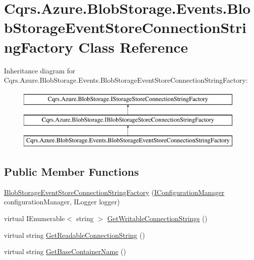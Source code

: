 \hypertarget{classCqrs_1_1Azure_1_1BlobStorage_1_1Events_1_1BlobStorageEventStoreConnectionStringFactory}{}\section{Cqrs.\+Azure.\+Blob\+Storage.\+Events.\+Blob\+Storage\+Event\+Store\+Connection\+String\+Factory Class Reference}
\label{classCqrs_1_1Azure_1_1BlobStorage_1_1Events_1_1BlobStorageEventStoreConnectionStringFactory}
Inheritance diagram for Cqrs.\+Azure.\+Blob\+Storage.\+Events.\+Blob\+Storage\+Event\+Store\+Connection\+String\+Factory\+:\begin{figure}[H]
\begin{center}
\leavevmode
\includegraphics[height=3.000000cm]{classCqrs_1_1Azure_1_1BlobStorage_1_1Events_1_1BlobStorageEventStoreConnectionStringFactory}
\end{center}
\end{figure}
\subsection*{Public Member Functions}
\begin{DoxyCompactItemize}
\item 
\hyperlink{classCqrs_1_1Azure_1_1BlobStorage_1_1Events_1_1BlobStorageEventStoreConnectionStringFactory_a6ace1481cc61d75f5d472e374566e477_a6ace1481cc61d75f5d472e374566e477}{Blob\+Storage\+Event\+Store\+Connection\+String\+Factory} (\hyperlink{interfaceCqrs_1_1Configuration_1_1IConfigurationManager}{I\+Configuration\+Manager} configuration\+Manager, I\+Logger logger)
\item 
virtual I\+Enumerable$<$ string $>$ \hyperlink{classCqrs_1_1Azure_1_1BlobStorage_1_1Events_1_1BlobStorageEventStoreConnectionStringFactory_a002b45d6a893b1b3024b0e7c97f1c9ac_a002b45d6a893b1b3024b0e7c97f1c9ac}{Get\+Writable\+Connection\+Strings} ()
\item 
virtual string \hyperlink{classCqrs_1_1Azure_1_1BlobStorage_1_1Events_1_1BlobStorageEventStoreConnectionStringFactory_aa47606e4cd5a71437bed71e07fda53ed_aa47606e4cd5a71437bed71e07fda53ed}{Get\+Readable\+Connection\+String} ()
\item 
virtual string \hyperlink{classCqrs_1_1Azure_1_1BlobStorage_1_1Events_1_1BlobStorageEventStoreConnectionStringFactory_a0e6aadced9c9a583884899a4c9de2f1a_a0e6aadced9c9a583884899a4c9de2f1a}{Get\+Base\+Container\+Name} ()
\end{DoxyCompactItemize}
